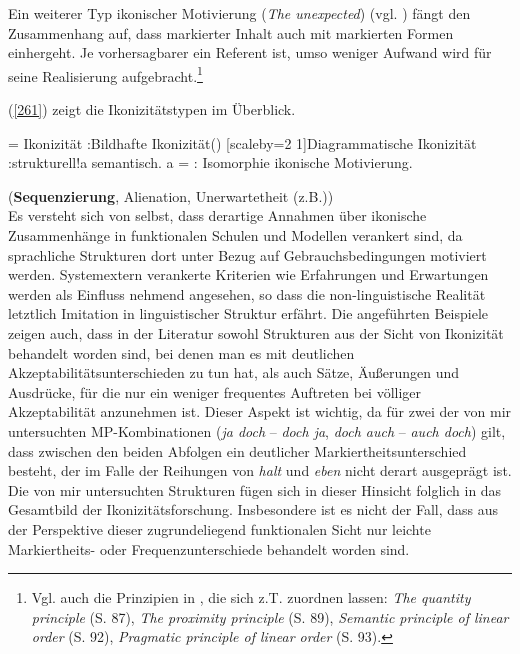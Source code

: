 Ein weiterer Typ ikonischer Motivierung  (\textit{The unexpected}) (vgl. \citealt[194]{Haiman1992}) fängt den Zusammenhang auf, dass markierter Inhalt auch mit markierten Formen  einhergeht. Je vorhersagbarer ein Referent ist, umso weniger Aufwand wird für seine Realisierung aufgebracht.\footnote{Vgl. auch die Prinzipien in \citet{Givon1991}, die sich z.T. zuordnen lassen: \textit{The quantity principle} (S. 87), \textit{The proximity principle} (S. 89), \textit{Semantic principle of linear order} (S. 92), \textit{Pragmatic principle of linear order} (S. 93).}

(\ref{261}) zeigt die Ikonizitätstypen im Überblick.

\begin{exe}
\ex\label{261}
\begin{jtree}[xunit=2, yunit=1]
\! = {Ikonizität}
       :{Bildhafte Ikonizität}() [scaleby=2 1]{Diagrammatische Ikonizität}
       :{strukturell}!a {semantisch}.
\!a = : {Isomorphie} {ikonische Motivierung}.
\end{jtree}
\end{exe}
\hfill{\scriptsize(\textbf{Sequenzierung}, Alienation, Unerwartetheit (z.B.))}\\

\noindent
Es versteht sich von selbst, dass derartige Annahmen über ikonische Zusammenhänge in funktionalen Schulen und Modellen verankert sind, da sprachliche Strukturen dort unter Bezug auf Gebrauchsbedingungen motiviert werden. Systemextern verankerte Kriterien wie Erfahrungen und Erwartungen werden als Einfluss nehmend angesehen, so dass die non-linguistische Realität letztlich I\-mitation in linguistischer Struktur erfährt. Die angeführten Beispiele zeigen auch, dass in der Literatur sowohl Strukturen aus der Sicht von Ikonizität behandelt worden sind, bei denen man es mit deutlichen Akzeptabilitätsunterschieden zu tun hat, als auch Sätze, Äußerungen und Ausdrücke, für die \glq nur\grq {} ein weniger frequentes Auftreten bei völliger Akzeptabilität anzunehmen ist. Dieser Aspekt ist wichtig, da für zwei der von mir untersuchten MP-Kombinationen (\textit{ja doch} – \textit{doch ja}, \textit{doch auch} – \textit{auch doch}) gilt, dass zwischen den beiden Abfolgen ein deutlicher Markiertheitsunterschied  besteht, der im Falle der Reihungen von \textit{halt} und \textit{eben} nicht derart ausgeprägt ist. Die von mir untersuchten Strukturen fügen sich in dieser Hinsicht folglich in das Gesamtbild der Ikonizitätsforschung. Insbesondere ist es nicht der Fall, dass aus der Perspektive dieser zugrundeliegend funktionalen Sicht nur leichte Markiertheits- oder Frequenzunterschiede behandelt worden sind.

